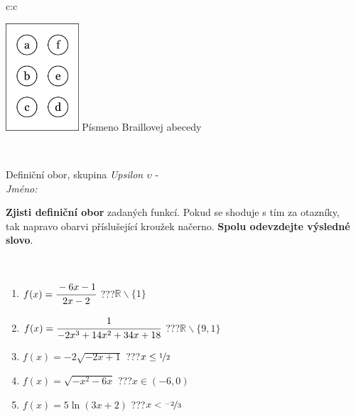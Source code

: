 \documentclass[10pt]{report}
\begin{document}
\begin{tabular}{c:c}
\begin{minipage}[c][104.5mm][t]{0.5\linewidth}
\begin{center}
\begin{minipage}{0.20\linewidth}
\begin{center}
\includegraphics[height=40mm]{../images/braille.png}
{\small Písmeno Braillovej abecedy}
\end{center}
\end{minipage}
\end{center}
\end{minipage}
\\ \hdashline
\begin{minipage}[c][104.5mm][t]{0.5\linewidth}
\begin{center}
\vspace{7mm}
{\huge Definiční obor, skupina \textit{Upsilon $\upsilon$} -}\\[5mm]
\textit{Jméno:}\phantom{xxxxxxxxxxxxxxxxxxxxxxxxxxxxxxxxxxxxxxxxxxxxxxxxxxxxxxxxxxxxxxxxx}\\[5mm]
\begin{minipage}{0.95\linewidth}
\begin{center}
\textbf{Zjisti definiční obor} zadaných funkcí. Pokud se shoduje s tím za otazníky,\\tak napravo obarvi příslušející kroužek načerno. \textbf{Spolu odevzdejte výsledné slovo}.
\end{center}
\end{minipage}
\\[1mm]
\begin{minipage}{0.79\linewidth}
\begin{center}
\begin{varwidth}{\linewidth}
\begin{enumerate}
\normalsizerrr
\item $f(x)=\cfrac{-6x-1}{2x-2}$\quad \dotfill\; ???\;\dotfill \quad $\mathbb{R}\smallsetminus\{1\}$
\item $f(x)=\cfrac{1}{-2x^3+14x^2+34x+18}$\quad \dotfill\; ???\;\dotfill \quad $\mathbb{R}\smallsetminus\{9,1\}$
\item $f(x)=-2\sqrt{-2x+1}$\quad \dotfill\; ???\;\dotfill \quad $x\leq\nicefrac{1}{2}$
\item $f(x)=\sqrt{-x^2-6x}$\quad \dotfill\; ???\;\dotfill \quad $x\in(-6 , 0)$
\item $f(x)=5\ln{(3x+2)}$\quad \dotfill\; ???\;\dotfill \quad $x<\nicefrac{-2}{3}$

\end{enumerate}
\end{varwidth}
\end{center}
\end{minipage}
\end{center}
\end{minipage}
\end{tabular}
\end{document}

